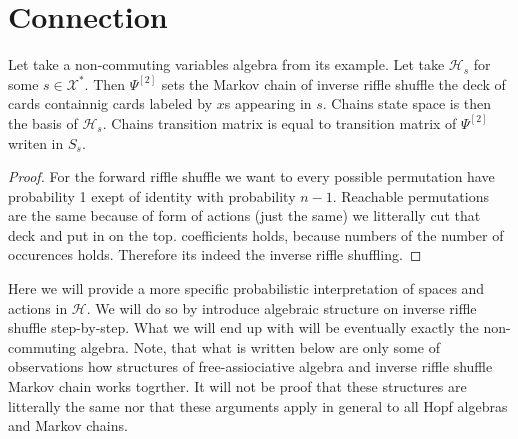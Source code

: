 \documentclass[a4paper, 12pt]{report}
\begin{document}
\chapter{Connection}
Let take a non-commuting variables algebra from its example. Let take $\mathcal{H}_s$ for some 
$s \in \mathcal{X}^*$. Then $\Psi^{[2]}$ sets the Markov chain of inverse riffle shuffle the deck of cards 
containnig cards labeled by $x$s appearing in $s$. Chains state space is then the basis of $\mathcal{H}_s$. 
Chains transition matrix is equal to transition matrix of $\Psi^{[2]}$ writen in $S_s$.  \\
\begin{proof}
For the forward riffle shuffle we want to every possible permutation have probability 1 exept of identity 
with probability $n-1$. Reachable permutations are the same because of form of actions (just the same)
we litterally cut that deck and put in on the top. coefficients holds, because numbers of the number of 
occurences holds. Therefore its indeed the inverse riffle shuffling.
\end{proof}

Here we will provide a more specific probabilistic interpretation of spaces and actions in $\mathcal{H}$.
We will do so by introduce algebraic structure on inverse riffle shuffle step-by-step. What we will end 
up with will be eventually exactly the non-commuting algebra. Note, that what is written below are only 
some of observations how structures of free-assiociative algebra and inverse riffle shuffle Markov chain 
works togrther. It will not be proof that these structures are litterally the same nor that these arguments 
apply  in general to all Hopf algebras and Markov chains.\\[4pt]
\end{document}
